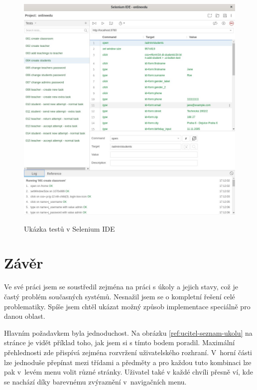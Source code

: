 \documentclass[twoside]{ctuthesis}
\theoremstyle{plain}
\theoremstyle{definition}
\theoremstyle{note}
\begin{document}
\begin{figure}
    \caption{Ukázka testů v Selenium IDE}
    \centering
    \includegraphics[width=\textwidth]{images/selenium}
    \label{img:selenium}
\end{figure}

\chapter{Závěr}


Ve své práci jsem se soustředil zejména na práci s úkoly a jejich stavy, což je častý problém současných systémů. Nesnažil jsem se o kompletní řešení celé problematiky. Spíše jsem chtěl ukázat možný způsob implementace speciálně pro danou oblast.

Hlavním požadavkem byla jednoduchost. Na obrázku \ref{ref:ucitel-seznam-ukolu} na stránce \pageref{ref:ucitel-seznam-ukolu} je vidět příklad toho, jak jsem si s tímto bodem poradil. Maximální přehlednosti zde přispívá zejména rozvržení uživatelského rozhraní. V~horní části lze jednoduše přepínat mezi třídami a předměty a pro každou tuto kombinaci lze pak v~levém menu volit různé stránky. Uživatel také v každé chvíli přesně ví, kde se nachází díky barevnému zvýraznění v~navigačních menu. 
\end{document}
